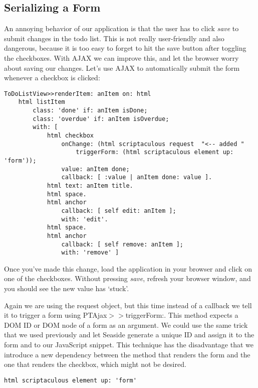 \documentclass[a4paper,10pt,twoside]{book}
\newcommand{\ct}[1]{{\small\ttfamily\textup{#1}}}
\begin{document}
\subsection{Serializing a Form}
\label{book:web20:scriptaculous:ajax:serializeform}

An annoying behavior of our application is that the user has to click \textit{save} to submit changes in the todo list. This is not really user-friendly and also dangerous, because it is too easy to forget to hit the save button after toggling the checkboxes. With AJAX we can improve this, and let the browser worry about saving our changes. Let's use AJAX to automatically submit the form whenever a checkbox is clicked:

\begin{lstlisting}
ToDoListView>>renderItem: anItem on: html
    html listItem
        class: 'done' if: anItem isDone;
        class: 'overdue' if: anItem isOverdue;
        with: [
            html checkbox
                onChange: (html scriptaculous request  "<-- added "
                    triggerForm: (html scriptaculous element up: 'form'));
                value: anItem done;
                callback: [ :value | anItem done: value ].
            html text: anItem title.
            html space.
            html anchor
                callback: [ self edit: anItem ];
                with: 'edit'.
            html space.
            html anchor
                callback: [ self remove: anItem ];
                with: 'remove' ]
\end{lstlisting}

Once you've made this change, load the application in your browser and click on one of the checkboxes. Without pressing \textit{save}, refresh your browser window, and you should see the new value has `stuck'.

Again we are using the request object, but this time instead of a callback we tell it to trigger a form using  \ct{PTAjax$>$$>$triggerForm:}. This method expects a DOM ID or DOM node of a form as an argument. We could use the same trick that we used previously and let Seaside generate a unique ID and assign it to the form and to our JavaScript snippet. This technique has the disadvantage that we introduce a new dependency between the method that renders the form and the one that renders the checkbox, which might not be desired.

\begin{lstlisting}
html scriptaculous element up: 'form'
\end{lstlisting}
\end{document}
